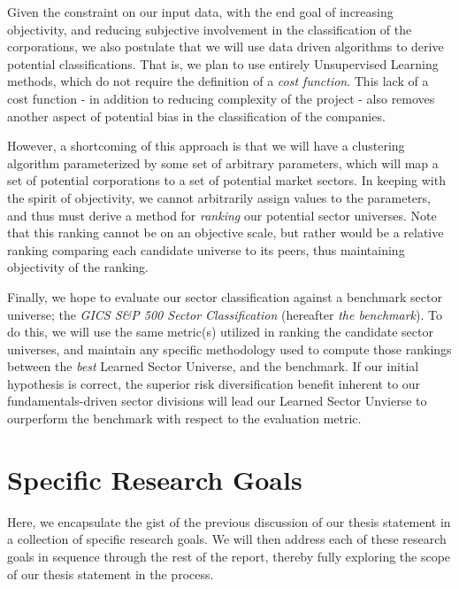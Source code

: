 \documentclass[../main.tex]{subfiles}
\begin{document}
Given the constraint on our input data, with the end goal of increasing objectivity, and reducing subjective involvement in the classification of the corporations, we also postulate that we will use data driven algorithms to derive potential classifications. That is, we plan to use entirely Unsupervised Learning methods, which do not require the definition of a \textit{cost function}. This lack of a cost function - in addition to reducing complexity of the project - also removes another aspect of potential bias in the classification of the companies.

However, a shortcoming of this approach is that we will have a clustering algorithm parameterized by some set of arbitrary parameters, which will map a set of potential corporations to a set of potential market sectors. In keeping with the spirit of objectivity, we cannot arbitrarily assign values to the parameters, and thus must derive a method for \textit{ranking} our potential sector universes. Note that this ranking cannot be on an objective scale, but rather would be a relative ranking comparing each candidate universe to its peers, thus maintaining objectivity of the ranking.

Finally, we hope to evaluate our sector classification against a benchmark sector universe; the \textit{GICS S\&P 500 Sector Classification} (hereafter \textit{the benchmark}). To do this, we will use the same metric(s) utilized in ranking the candidate sector universes, and maintain any specific methodology used to compute those rankings between the \textit{best} Learned Sector Universe, and the benchmark. If our initial hypothesis is correct, the superior risk diversification benefit inherent to our fundamentals-driven sector divisions will lead our Learned Sector Unvierse to ourperform the benchmark with respect to the evaluation metric.

\section{Specific Research Goals}

Here, we encapsulate the gist of the previous discussion of our thesis statement in a collection of specific research goals. We will then address each of these research goals in sequence through the rest of the report, thereby fully exploring the scope of our thesis statement in the process.

\vspace{2em}
\end{document}
